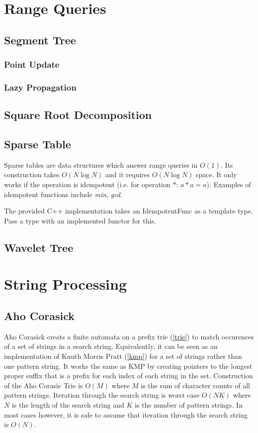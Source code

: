 \documentclass[letterpaper,11pt,twoside]{article}
\begin{document}
        \section{Range Queries}
            \subsection{Segment Tree}
                \subsubsection{Point Update}
                \subsubsection{Lazy Propagation}
            \subsection{Square Root Decomposition}
            \subsection{Sparse Table}
                Sparse tables are data structures which answer range queries in $O(1)$.
                Its construction takes $O(N\log N)$ and it requires $O(N\log N)$ space.
                It only works if the operation is idempotent (i.e. for operation $*$: $a*a = a$).
                Examples of idempotent functions include \emph{min}, \emph{gcd}.
                
                The provided C++ implementation takes an IdempotentFunc as a template type.
                Pass a type with an implemented functor for this.
                
            \subsection{Wavelet Tree}

        \section{String Processing}
            \subsection{Aho Corasick}
                Aho Corasick creats a finite automata on a prefix trie (\ref{trie}) to match occurences of a set of strings in a search string.
                Equivalently, it can be seen as an implementation of Knuth Morris Pratt (\ref{kmp}) for a set of strings rather than one pattern string.
                It works the same as KMP by creating pointers to the longest proper suffix that is a prefix for each index of each string in the set.
                Construction of the Aho Corasic Trie is $O(M)$ where $M$ is the sum of character counts of all pattern strings.
                Iteration through the search string is worst case $O(NK)$ where $N$ is the length of the search string and $K$ is the number of pattern strings.
                In most cases however, it is safe to assume that iteration through the search string is $O(N)$.
\end{document}
